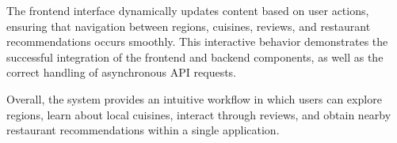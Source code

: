 \detailedCuisinesFigure

The frontend interface dynamically updates content based on user actions, 
ensuring that navigation between regions, cuisines, reviews, and 
restaurant recommendations occurs smoothly. This interactive behavior 
demonstrates the successful integration of the frontend and backend 
components, as well as the correct handling of asynchronous API requests.

Overall, the system provides an intuitive workflow in which users 
can explore regions, learn about local cuisines, interact through 
reviews, and obtain nearby restaurant recommendations within a 
single application.



